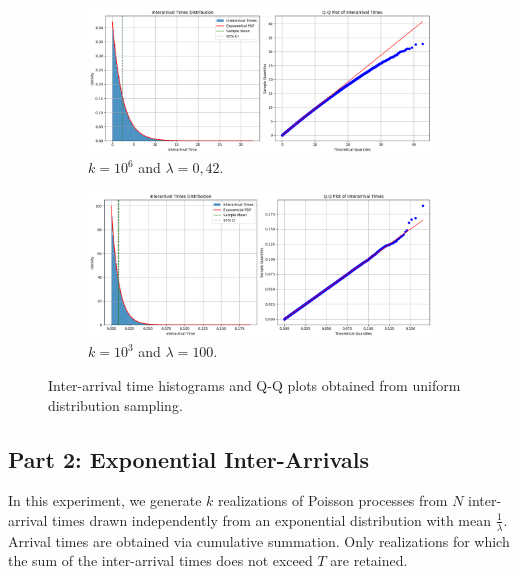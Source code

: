 \documentclass[a4paper]{article}
\begin{document}
\begin{figure}[htbp]
  \centering
  \begin{subfigure}[b]{0.48\textwidth}
    \centering
    \includegraphics[width=\textwidth]{images/ex1-p1.png}
    \caption{$k = 10^6$ and $\lambda = 0,42$.}\label{fig:ex1-p1}
  \end{subfigure}
  \hfill
  \begin{subfigure}[b]{0.48\textwidth}
    \centering
    \includegraphics[width=\textwidth]{images/ex1-p1-hl.png}
    \caption{$k = 10^3$ and $\lambda = 100$.}\label{fig:ex1-p1-hl}
  \end{subfigure}
  \caption{Inter-arrival time histograms and Q-Q plots obtained from
  uniform distribution sampling.}\label{fig:ex1-p1-combined}
\end{figure}

\subsection*{Part 2: Exponential Inter-Arrivals}

In this experiment, we generate $k$ realizations of Poisson processes
from $N$ inter-arrival times drawn independently from an exponential
distribution with mean $\frac{1}{\lambda}$. Arrival times are
obtained via cumulative summation. Only realizations for which the
sum of the inter-arrival times does not exceed $T$ are retained.
\end{document}
